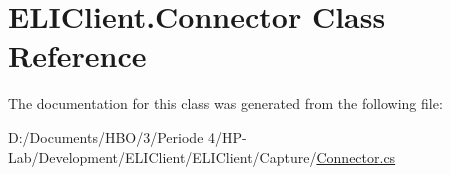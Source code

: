 \hypertarget{class_e_l_i_client_1_1_connector}{}\section{E\+L\+I\+Client.\+Connector Class Reference}
\label{class_e_l_i_client_1_1_connector}


The documentation for this class was generated from the following file\+:\begin{DoxyCompactItemize}
\item 
D\+:/\+Documents/\+H\+B\+O/3/\+Periode 4/\+H\+P-\/\+Lab/\+Development/\+E\+L\+I\+Client/\+E\+L\+I\+Client/\+Capture/\hyperlink{_connector_8cs}{Connector.\+cs}\end{DoxyCompactItemize}
